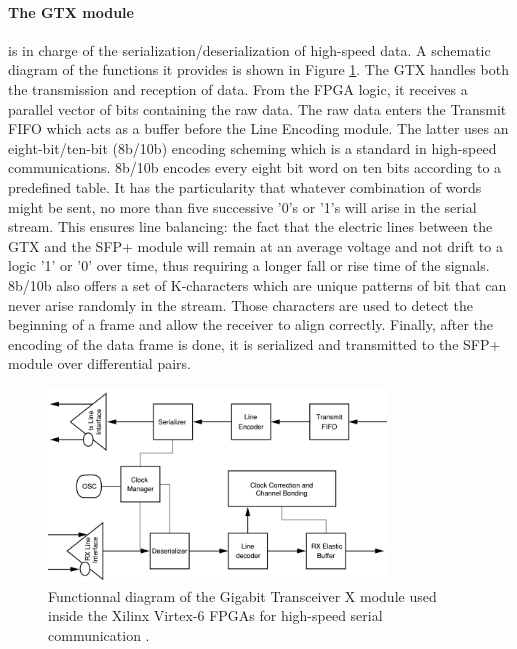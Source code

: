       \paragraph{The GTX module} is in charge of the serialization/deserialization of high-speed data. A schematic diagram of the functions it provides is shown in Figure \ref{fig:II-3-gtx}. The GTX handles both the transmission and reception of data. From the FPGA logic, it receives a parallel vector of bits containing the raw data. The raw data enters the Transmit FIFO which acts as a buffer before the Line Encoding module. The latter uses an eight-bit/ten-bit (8b/10b) encoding scheming which is a standard in high-speed communications. 8b/10b encodes every eight bit word on ten bits according to a predefined table. It has the particularity that whatever combination of words might be sent, no more than five successive '0's or '1's will arise in the serial stream. This ensures line balancing: the fact that the electric lines between the GTX and the SFP+ module will remain at an average voltage and not drift to a logic '1' or '0' over time, thus requiring a longer fall or rise time of the signals. 8b/10b also offers a set of K-characters which are unique patterns of bit that can never arise randomly in the stream. Those characters are used to detect the beginning of a frame and allow the receiver to align correctly. Finally, after the encoding of the data frame is done, it is serialized and transmitted to the SFP+ module over differential pairs. \\

      \begin{figure}[h!]
        \centering
        \includegraphics[width=0.8\textwidth]{img/II-3-test-beam/gtx.png}
        \caption{Functionnal diagram of the Gigabit Transceiver X module used inside the Xilinx Virtex-6 FPGAs for high-speed serial communication \cite{GTX}.}
        \label{fig:II-3-gtx}
      \end{figure}

